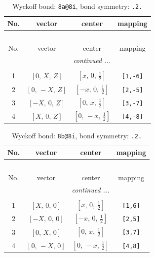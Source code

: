\documentclass[fleqn,8pt]{jsarticle}
\begin{document}
\begin{longtable}{cccc}
\caption{Wyckoff bond: {\tt 8a@8i}, bond symmetry: {\tt .2.}}
 \\
 \hline \hline
No. & vector & center & mapping \\ \hline \endfirsthead

\multicolumn{3}{l}{\tablename\ \thetable{}} \\
 \hline \hline
No. & vector & center & mapping \\ \hline \endhead

 \hline \hline
\multicolumn{3}{r}{\footnotesize\it continued ...} \\ \endfoot

 \hline \hline
\multicolumn{3}{r}{} \\ \endlastfoot

1 & $\left[ 0,\, X,\, Z \right]$ & $\left[ x,\, 0,\, \frac{1}{2} \right]$ & {\tt [1,-6]} \\ \hline
2 & $\left[ 0,\, - X,\, Z \right]$ & $\left[ - x,\, 0,\, \frac{1}{2} \right]$ & {\tt [2,-5]} \\ \hline
3 & $\left[ - X,\, 0,\, Z \right]$ & $\left[ 0,\, x,\, \frac{1}{2} \right]$ & {\tt [3,-7]} \\ \hline
4 & $\left[ X,\, 0,\, Z \right]$ & $\left[ 0,\, - x,\, \frac{1}{2} \right]$ & {\tt [4,-8]} \\
\end{longtable}
\renewcommand{\arraystretch}{1.2}
\begin{longtable}{cccc}
\caption{Wyckoff bond: {\tt 8b@8i}, bond symmetry: {\tt .2.}}
 \\
 \hline \hline
No. & vector & center & mapping \\ \hline \endfirsthead

\multicolumn{3}{l}{\tablename\ \thetable{}} \\
 \hline \hline
No. & vector & center & mapping \\ \hline \endhead

 \hline \hline
\multicolumn{3}{r}{\footnotesize\it continued ...} \\ \endfoot

 \hline \hline
\multicolumn{3}{r}{} \\ \endlastfoot

1 & $\left[ X,\, 0,\, 0 \right]$ & $\left[ x,\, 0,\, \frac{1}{2} \right]$ & {\tt [1,6]} \\ \hline
2 & $\left[ - X,\, 0,\, 0 \right]$ & $\left[ - x,\, 0,\, \frac{1}{2} \right]$ & {\tt [2,5]} \\ \hline
3 & $\left[ 0,\, X,\, 0 \right]$ & $\left[ 0,\, x,\, \frac{1}{2} \right]$ & {\tt [3,7]} \\ \hline
4 & $\left[ 0,\, - X,\, 0 \right]$ & $\left[ 0,\, - x,\, \frac{1}{2} \right]$ & {\tt [4,8]} \\
\end{longtable}
\end{document}
